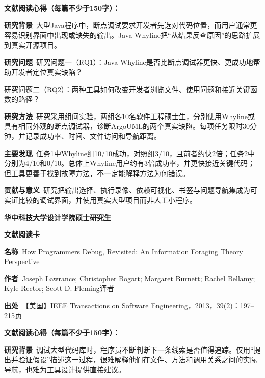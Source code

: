 \vspace{0.35em}
\noindent\textbf{文献阅读心得（每篇不少于150字）：}\par
\noindent\textbf{研究背景}\ 大型Java程序中，断点调试要求开发者先选对代码位置，而用户通常更容易识别界面中出现或缺失的输出。Java Whyline把“从结果反查原因”的思路扩展到真实开源项目。\par
\noindent\textbf{研究问题}\ 研究问题一（RQ1）：Java Whyline是否比断点调试器更快、更成功地帮助开发者定位真实缺陷？\par
研究问题二（RQ2）：两种工具如何改变开发者浏览文件、使用问题和接近关键函数的路径？\par
\noindent\textbf{研究方法}\ 研究采用组间实验，两组各10名软件工程硕士生，分别使用Whyline或具有相同外观的断点调试器，诊断ArgoUML的两个真实缺陷。每项任务限时30分钟，并记录成功率、时间、文件访问和导航距离。\par
\noindent\textbf{主要发现}\ 任务1中Whyline组10/10成功，对照组3/10，且前者约快2倍；任务2中分别为4/10和0/10。总体上Whyline用户约有3倍成功率，并更快接近关键代码；但工具更善于找到故障方法，不一定能解释方法为何错误。\par
\noindent\textbf{贡献与意义}\ 研究把输出选择、执行录像、依赖可视化、书签与问题导航集成为可实证比较的调试界面，并使用真实大型项目而非人工小程序。\par
\clearpage
\begin{center}
{\songti\bfseries\fontsize{18.5pt}{27.75pt}\selectfont 华中科技大学设计学院硕士研究生\par}
{\songti\bfseries\fontsize{18.5pt}{27.75pt}\selectfont 文献阅读卡\par}
\end{center}
\vspace{0.25em}
\noindent\underline{}\par
\vspace{0.35em}
\noindent\textbf{名称}\ How Programmers Debug, Revisited: An Information Foraging Theory Perspective\par
\noindent\textbf{作者}\ Joseph Lawrance; Christopher Bogart; Margaret Burnett; Rachel Bellamy; Kyle Rector; Scott D. Fleming\quad 译者\par
\noindent\textbf{出处}\ 【美国】IEEE Transactions on Software Engineering，2013，39(2)：197–215\quad 页\par
\vspace{0.35em}
\noindent\textbf{文献阅读心得（每篇不少于150字）：}\par
\noindent\textbf{研究背景}\ 调试大型代码库时，程序员不断判断下一条线索是否值得追踪。仅用“提出并验证假设”描述这一过程，很难解释他们在文件、方法和调用关系之间的实际导航，也难为工具设计提供直接建议。\par
